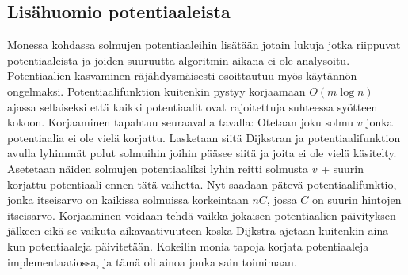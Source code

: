 \documentclass[a4paper, 11pt]{article}
\begin{document}
\subsection*{Lisähuomio potentiaaleista}
Monessa kohdassa solmujen potentiaaleihin lisätään jotain lukuja jotka riippuvat potentiaaleista
ja joiden suuruutta
algoritmin aikana ei ole analysoitu. Potentiaalien kasvaminen räjähdysmäisesti osoittautuu
myös käytännön ongelmaksi. Potentiaalifunktion kuitenkin pystyy korjaamaan $O(m \log n)$ ajassa
sellaiseksi että kaikki potentiaalit ovat rajoitettuja suhteessa syötteen kokoon.
Korjaaminen tapahtuu seuraavalla tavalla: Otetaan joku solmu $v$ jonka potentiaalia 
ei ole vielä korjattu. Lasketaan siitä
Dijkstran ja potentiaalifunktion avulla lyhimmät polut solmuihin joihin pääsee siitä ja joita ei ole
vielä käsitelty. Asetetaan näiden solmujen potentiaaliksi lyhin reitti solmusta $v$ + 
suurin korjattu potentiaali ennen tätä vaihetta. Nyt saadaan pätevä potentiaalifunktio, jonka
itseisarvo on kaikissa solmuissa korkeintaan $nC$, jossa $C$ on suurin hintojen itseisarvo. Korjaaminen
voidaan tehdä vaikka jokaisen potentiaalien päivityksen jälkeen eikä se vaikuta aikavaativuuteen koska
Dijkstra ajetaan kuitenkin aina kun potentiaaleja päivitetään. Kokeilin monia tapoja
korjata potentiaaleja implementaatiossa, ja tämä oli ainoa jonka sain toimimaan.
\end{document}

